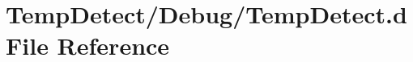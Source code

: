 \hypertarget{_temp_detect_8d}{}\section{Temp\+Detect/\+Debug/\+Temp\+Detect.d File Reference}
\label{_temp_detect_8d}
